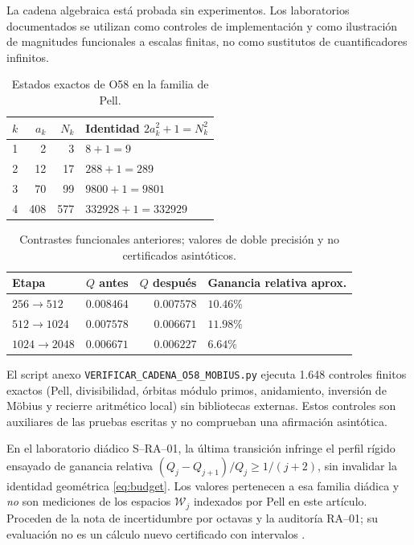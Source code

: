 \documentclass[11pt,a4paper]{article}
\theoremstyle{mine}
\theoremstyle{definition}
\newcommand{\WW}{\mathcal W}
\begin{document}
La cadena algebraica está probada sin experimentos. Los laboratorios documentados se utilizan como controles de implementación y como ilustración de magnitudes funcionales a escalas finitas, no como sustitutos de cuantificadores infinitos.

\begin{table}[ht]
\centering\small
\caption{Estados exactos de O58 en la familia de Pell.}
\begin{tabular}{@{}r r r l@{}}\toprule
$k$&$a_k$&$N_k$&Identidad $2a_k^2+1=N_k^2$\\\midrule
1&2&3&$8+1=9$\\
2&12&17&$288+1=289$\\
3&70&99&$9800+1=9801$\\
4&408&577&$332928+1=332929$\\\bottomrule
\end{tabular}
\end{table}

\begin{table}[ht]
\centering\small
\caption{Contrastes funcionales anteriores; valores de doble precisión y no certificados asintóticos.}
\begin{tabular}{@{}l r r l@{}}\toprule
Etapa&$Q$ antes&$Q$ después&Ganancia relativa aprox.\\\midrule
$256\to512$&$0.008464$&$0.007578$&$10.46\%$\\
$512\to1024$&$0.007578$&$0.006671$&$11.98\%$\\
$1024\to2048$&$0.006671$&$0.006227$&$6.64\%$\\\bottomrule
\end{tabular}
\end{table}

El script anexo \texttt{VERIFICAR\_CADENA\_O58\_MOBIUS.py} ejecuta 1.648 controles finitos exactos (Pell, divisibilidad, órbitas módulo primos, anidamiento, inversión de Möbius y recierre aritmético local) sin bibliotecas externas. Estos controles son auxiliares de las pruebas escritas y no comprueban una afirmación asintótica.

En el laboratorio diádico S--RA--01, la última transición infringe el perfil rígido ensayado de ganancia relativa $(Q_j-Q_{j+1})/Q_j\ge1/(j+2)$, sin invalidar la identidad geométrica \eqref{eq:budget}. Los valores pertenecen a esa familia diádica y \emph{no} son mediciones de los espacios $\WW_j$ indexados por Pell en este artículo. Proceden de la nota de incertidumbre por octavas y la auditoría RA--01; su evaluación no es un cálculo nuevo certificado con intervalos \cite{Incert,RA01Audit}.
\end{document}
